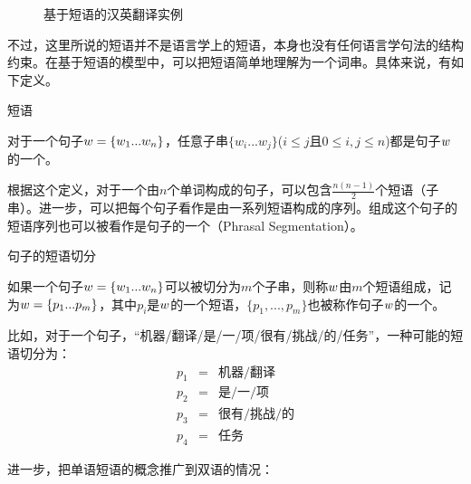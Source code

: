 \begin{figure}[htp]
\centering

\caption{基于短语的汉英翻译实例}
\label{fig:7-9}
\end{figure}

\parinterval 不过，这里所说的短语并不是语言学上的短语，本身也没有任何语言学句法的结构约束。在基于短语的模型中，可以把短语简单地理解为一个词串。具体来说，有如下定义。

\vspace{0.5em}
\begin{definition} 短语

{\small
对于一个句子${w} = \{ w_1...w_n \} $，任意子串$\{ w_i...w_j\}$($i\leq j$且$0\leq i,j\leq n$)都是句子${w}$的一个{\small{}}。
}
\end{definition}

\parinterval 根据这个定义，对于一个由$n$个单词构成的句子，可以包含$\frac{n(n-1)}{2}$个短语（子串）。进一步，可以把每个句子看作是由一系列短语构成的序列。组成这个句子的短语序列也可以被看作是句子的一个{\small{}}（Phrasal Segmentation）。

\vspace{0.5em}
\begin{definition} 句子的短语切分

{\small
如果一个句子${w} = \{ w_1...w_n\}$可以被切分为$m$个子串，则称${w}$由$m$个短语组成，记为${w} =\{ p_1...p_m \} $，其中$p_i$是${w}$的一个短语，$\{p_1,...,p_m\}$也被称作句子${w}$的一个{\small{}}。
}
\end{definition}

\parinterval 比如，对于一个句子，“机器/翻译/是/一/项/很有/挑战/的/任务”，一种可能的短语切分为：
\begin{eqnarray}
p_1 &=& \text{机器}/\text{翻译} \nonumber \\
p_2 &=& \text{是}/\text{一}/\text{项} \nonumber \\
p_3 &=& \text{很有}/\text{挑战}/\text{的} \nonumber \\
p_4 &=& \text{任务}\nonumber
\end{eqnarray}

\parinterval 进一步，把单语短语的概念推广到双语的情况：

